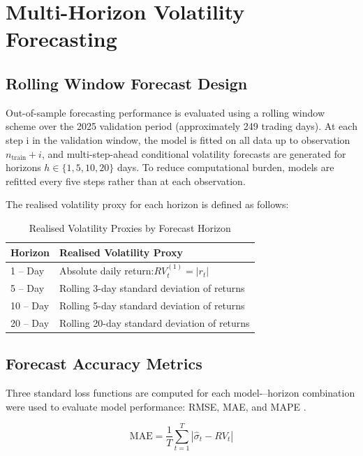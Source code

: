 \section{Multi-Horizon Volatility Forecasting }
\subsection{Rolling Window Forecast Design}

Out-of-sample forecasting performance is evaluated using a rolling window scheme over the 2025 validation period (approximately 249 trading days). At each step i in the validation window, the model is fitted on all data up to observation $n_{\text{train}} + i$, and multi-step-ahead conditional volatility forecasts are generated for horizons $h \in \{1,5,10,20\}$ days. To reduce computational burden, models are refitted every five steps rather than at each observation.

The realised volatility proxy for each horizon is defined as follows:

\begin{table}[h]
\centering
\caption{Realised Volatility Proxies by Forecast Horizon}
\label{horizon 1,5,10,20}
\begin{tabular}{|l|l|}
\hline
\textbf{Horizon} & \textbf{Realised Volatility Proxy}  \\
\hline
 1 -- Day & Absolute daily return:$RV_t^{(1)} = |r_t|$  \\
\hline
 5 -- Day  & Rolling 3-day standard deviation of returns \\
\hline
 10 -- Day  & Rolling 5-day standard deviation of returns \\
\hline
 20 -- Day  & Rolling 20-day standard deviation of returns \\
\hline

\end{tabular}
\end{table}

\subsection{Forecast Accuracy Metrics}
Three standard loss functions are computed for each model-–horizon combination were used to evaluate model performance: RMSE, MAE, and MAPE \citep{hyndman2006, armstrong1992}.

\begin{equation}
\label{MAE}
\text{MAE}
=
\frac{1}{T}
\sum_{t=1}^{T}
\left|
\hat{\sigma}_t - RV_t
\right|
\end{equation}

